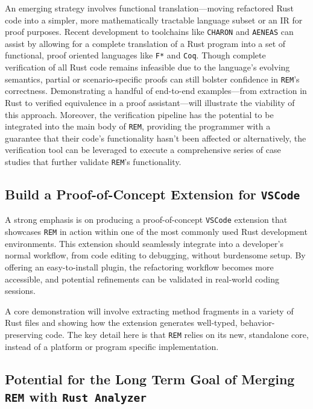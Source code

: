 An emerging strategy involves functional translation---moving refactored Rust
code into a simpler, more mathematically tractable language subset or an IR for
proof purposes. Recent development to toolchains like
\texttt{CHARON}\cite{charon} and \texttt{AENEAS}\cite{aeneas} can assist by
allowing for a complete translation of a Rust program into a set of functional,
proof oriented languages like \texttt{F*} and \texttt{Coq}. Though complete
verification of all Rust code remains infeasible due to the language’s evolving
semantics, partial or scenario-specific proofs can still bolster confidence in
\texttt{REM}’s correctness. Demonstrating a handful of end-to-end
examples---from extraction in Rust to verified equivalence in a proof
assistant---will illustrate the viability of this approach. Moreover, the
verification pipeline has the potential to be integrated into the main body of
\texttt{REM}, providing the programmer with a guarantee that their code’s
functionality hasn’t been affected or alternatively, the verification tool can
be leveraged to execute a comprehensive series of case studies that further
validate \texttt{REM}’s functionality.

\subsection{Build a Proof-of-Concept Extension for \texttt{VSCode}}
\label{sec:vscode-extension}

A strong emphasis is on producing a proof-of-concept \texttt{VSCode} extension
that showcases \texttt{REM} in action within one of the most commonly used Rust
development environments. This extension should seamlessly integrate into a
developer’s normal workflow, from code editing to debugging, without burdensome
setup. By offering an easy-to-install plugin, the refactoring workflow becomes
more accessible, and potential refinements can be validated in real-world coding
sessions.

A core demonstration will involve extracting method fragments in a variety of
Rust files and showing how the extension generates well-typed,
behavior-preserving code. The key detail here is that \texttt{REM} relies on its
new, standalone core, instead of a platform or program specific implementation.

\subsection{Potential for the Long Term Goal of Merging \texttt{REM} with
\texttt{Rust Analyzer}}
\label{sec:long-term-goal}

